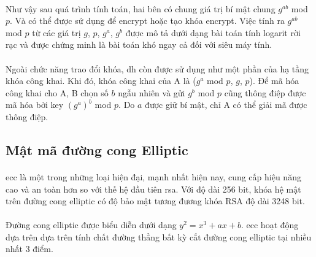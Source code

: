 \paragraph{}
Như vậy sau quá trình tính toán, hai bên có chung giá trị bí mật chung $g^{ab}$ mod $p$. Và có thể được sử dụng để \gls{encrypt} hoặc tạo khóa \gls{encrypt}. Việc tính ra $g^{ab}$ mod $p$ từ các giá trị $g$, $p$, $g^a$, $g^b$ được mô tả dưới dạng bài toán tính logarit rời rạc và được chứng minh là bài toán khó ngay cả đối với siêu máy tính.

\paragraph{}
Ngoài chức năng trao đổi khóa, \gls{dh} còn được sử dụng như một phần của hạ tầng khóa công khai. Khi đó, khóa công khai của A là ($g^a$ mod $p$, $g$, $p$). Để mã hóa công khai cho A, B chọn số $b$ ngẫu nhiên và gửi $g^b$ mod $p$ cũng thông điệp được mã hóa bởi \gls{key} $(g^a)^b$ mod $p$. Do $a$ được giữ bí mật, chỉ A có thể giải mã được thông điệp.

\subsection{Mật mã đường cong Elliptic}

\paragraph{}
\gls{ecc} là một trong những loại hiện đại, mạnh nhất hiện nay, cung cấp hiệu năng cao và an toàn hơn so với thế hệ đầu tiên \gls{rsa}. Với độ dài 256 bit, khóa hệ mật trên đường cong elliptic có độ bảo mật tương đương khóa RSA độ dài 3248 bit.

\paragraph{}
Đường cong elliptic được biểu diễn dưới dạng $y^2=x^3+ax+b$. \gls{ecc} hoạt động dựa trên dựa trên tính chất đường thẳng bất kỳ cắt đường cong elliptic tại nhiều nhất 3 điểm.

